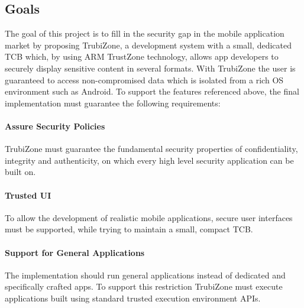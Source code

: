 \subsection{Goals}



The goal of this project is to fill in the security gap in the mobile application market by proposing TrubiZone, a development system with a small, dedicated \ac{TCB} which, by using ARM TrustZone technology, allows app developers to securely display sensitive content in several formats. With TrubiZone the user is guaranteed  to access non-compromised data which is isolated from a rich OS environment such as Android.
%
To support the features referenced above, the final implementation must guarantee the following requirements:
%
\paragraph*{\textbf{Assure Security Policies\\}} TrubiZone must guarantee the fundamental security properties of confidentiality, integrity and authenticity, on which every high level security application can be built on.

\paragraph*{\textbf{Trusted UI\\}} To allow the development of realistic mobile applications, secure user interfaces must be supported, while trying to maintain a small, compact \ac{TCB}.

\paragraph*{\textbf{Support for General Applications\\}} The implementation should run general applications instead of dedicated and specifically crafted apps. To support this restriction TrubiZone must execute applications built using standard trusted execution environment APIs.

